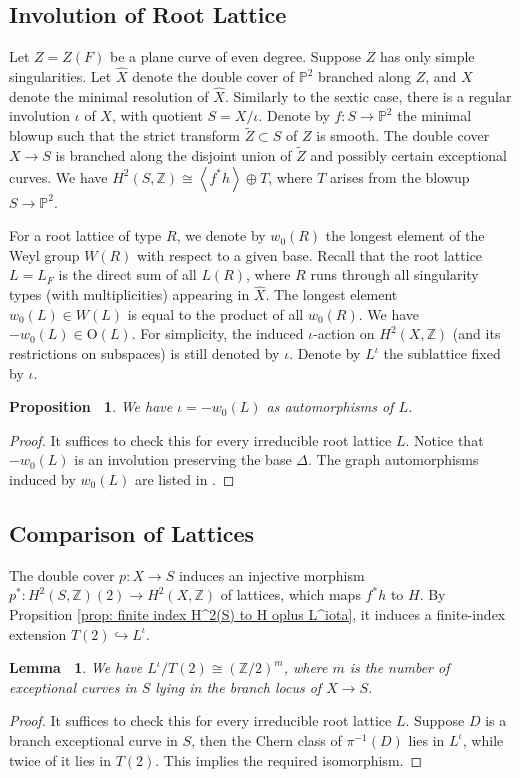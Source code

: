 \documentclass[12pt,reqno,a4paper]{amsart}
\newtheorem{lem}[thm]{Lemma~}
\newtheorem{prop}[thm]{Proposition~}
\theoremstyle{remark}
\theoremstyle{definition}
\begin{document}
\subsection{Involution of Root Lattice}
Let $Z=Z(F)$ be a plane curve of even degree. Suppose $Z$ has only simple singularities. 
Let $\widehat{X}$ denote the double cover of $\mathbb{P}^2$ branched along $Z$, and $X$ denote the minimal resolution of $\widehat{X}$.
Similarly to the sextic case, there is a regular involution $\iota$ of $X$, with quotient $S=X/\iota$. Denote by $f\colon S\to \mathbb{P}^2$ the minimal blowup such that the strict transform $\widetilde{Z}\subset S$ of $Z$ is smooth. The double cover $X\to S$ is branched along the disjoint union of $\widetilde{Z}$ and possibly certain exceptional curves. We have $H^2(S,\mathbb{Z})\cong \left\langle f^* h\right\rangle\oplus T$, where $T$ arises from the blowup $S\to \mathbb{P}^2$.

For a root lattice of type $R$, we denote by $w_0(R)$ the longest element of the Weyl group $W(R)$ with respect to a given base.
Recall that the root lattice $L=L_F$ is the direct sum of all $L(R)$, where $R$ runs through all singularity types (with multiplicities) appearing in $\widehat{X}$. 
The longest element $w_0(L)\in W(L)$ is equal to the product of all $w_0(R)$. We have $-w_0(L)\in \mathrm{O}(L)$. For simplicity, the induced $\iota$-action on $H^2(X,\mathbb{Z})$ (and its restrictions on subspaces) is still denoted by $\iota$. Denote by $L^\iota$ the sublattice fixed by $\iota$. \begin{prop}
We have $\iota=-w_0(L)$ as automorphisms of $L$.
\end{prop}
\begin{proof}
It suffices to check this for every irreducible root lattice $L$. Notice that $-w_0(L)$ is an involution preserving the base $\Delta$. The graph automorphisms induced by $w_0(L)$ are listed in \cite[PLATE I--X]{bourbaki2002lie4-6}.
\end{proof}

\subsection{Comparison of Lattices}
The double cover $p\colon X\to S$ induces an injective morphism $p^*\colon H^2(S,\mathbb{Z})(2)\to H^2(X,\mathbb{Z})$ of lattices, which maps $f^* h$ to $H$. By Propsition \ref{prop: finite index H^2(S) to H oplus L^iota}, it induces a finite-index extension $T(2)\hookrightarrow L^{\iota}$. 
\begin{lem}
\label{lem: T_F and L_F}
We have $L^{\iota}/T(2)\cong (\mathbb{Z}/2)^m$, where $m$ is the number of exceptional curves in $S$ lying in the branch locus of $X\to S$.
\end{lem}
\begin{proof}
It suffices to check this for every irreducible root lattice $L$. Suppose $D$ is a branch exceptional curve in $S$, then the Chern class of $\pi^{-1}(D)$ lies in $L^\iota$, while twice of it lies in $T(2)$. This implies the required isomorphism.
\end{proof}
\end{document}
